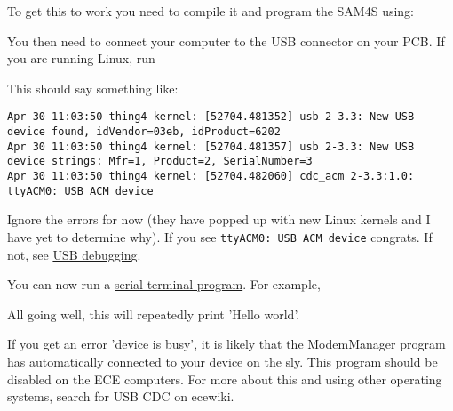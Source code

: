To get this to work you need to compile it and program the SAM4S using:

\begin{Shaded}
\begin{Highlighting}[]
\NormalTok{$ }
\NormalTok{$ }
\end{Highlighting}
\end{Shaded}

You then need to connect your computer to the USB connector on your PCB.
If you are running Linux, run

\begin{Shaded}
\begin{Highlighting}[]
\NormalTok{$ }
\end{Highlighting}
\end{Shaded}

This should say something like:

\begin{verbatim}
Apr 30 11:03:50 thing4 kernel: [52704.481352] usb 2-3.3: New USB device found, idVendor=03eb, idProduct=6202
Apr 30 11:03:50 thing4 kernel: [52704.481357] usb 2-3.3: New USB device strings: Mfr=1, Product=2, SerialNumber=3
Apr 30 11:03:50 thing4 kernel: [52704.482060] cdc_acm 2-3.3:1.0: ttyACM0: USB ACM device
\end{verbatim}

Ignore the errors for now (they have popped up with new Linux kernels
and I have yet to determine why). If you see
\texttt{ttyACM0:\ USB\ ACM\ device} congrats. If not, see
\href{USB_debugging}{USB debugging}.

You can now run a \href{Serial_terminal_applications}{serial terminal
program}. For example,

\begin{Shaded}
\begin{Highlighting}[]
\end{Highlighting}
\end{Shaded}

All going well, this will repeatedly print 'Hello world'.

If you get an error 'device is busy', it is likely that the ModemManager
program has automatically connected to your device on the sly. This
program should be disabled on the ECE computers. For more about this and
using other operating systems, search for USB CDC on ecewiki.

